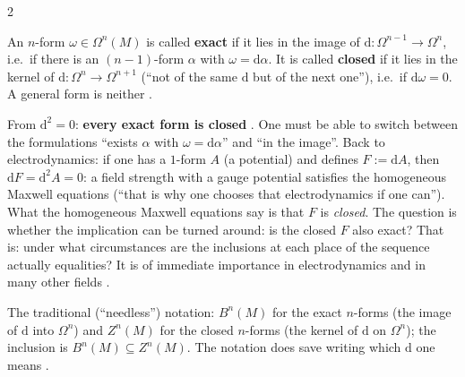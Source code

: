 \begin{paracol}{2}
\begin{definition}\label{def:gr-exact}
An $n$-form $\omega\in\Omega^n(M)$ is called \textbf{exact} if it lies in the image of $\mathrm d\colon\Omega^{n-1}\to\Omega^n$, i.e.\ if there is an $(n-1)$-form $\alpha$ with $\omega=\mathrm d\alpha$. It is called \textbf{closed} if it lies in the kernel of $\mathrm d\colon\Omega^n\to\Omega^{n+1}$ (``not of the same $\mathrm d$ but of the next one''), i.e.\ if $\mathrm d\omega=0$. A general form is neither        .
\end{definition}
From $\mathrm d^2=0$: \textbf{every exact form is closed}  . One must be able to switch between the formulations ``exists $\alpha$ with $\omega=\mathrm d\alpha$'' and ``in the image''.
Back to electrodynamics: if one has a $1$-form $A$ (a potential) and defines $F:=\mathrm dA$, then $\mathrm dF=\mathrm d^2A=0$: a field strength with a gauge potential satisfies the homogeneous Maxwell equations (``that is why one chooses that electrodynamics if one can''). What the homogeneous Maxwell equations say is that $F$ is \emph{closed}. The question is whether the implication can be turned around: is the closed $F$ also exact?
That is: under what circumstances are the inclusions at each place of the sequence actually equalities? It is of immediate importance in electrodynamics and in many other fields       .

The traditional (``needless'') notation: $B^n(M)$ for the exact $n$-forms (the image of $\mathrm d$ into $\Omega^n$) and $Z^n(M)$ for the closed $n$-forms (the kernel of $\mathrm d$ on $\Omega^n$); the inclusion is $B^n(M)\subseteq Z^n(M)$. The notation does save writing which $\mathrm d$ one means      .


\end{paracol}
